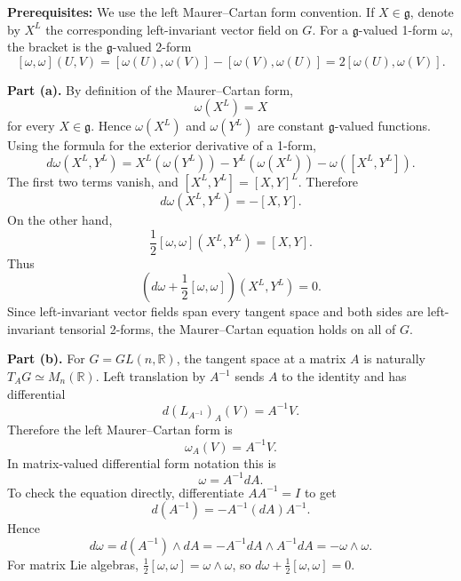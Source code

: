 \begin{solution}
\textbf{Prerequisites:}
We use the left Maurer--Cartan form convention. If $X\in\mathfrak{g}$, denote by
$X^L$ the corresponding left-invariant vector field on $G$. For a
$\mathfrak{g}$-valued 1-form $\omega$, the bracket is the
$\mathfrak{g}$-valued 2-form
\[
    [\omega,\omega](U,V)
    =
    [\omega(U),\omega(V)]-[\omega(V),\omega(U)]
    =
    2[\omega(U),\omega(V)].
\]

\textbf{Part (a).}
By definition of the Maurer--Cartan form,
\[
    \omega(X^L)=X
\]
for every $X\in\mathfrak{g}$. Hence $\omega(X^L)$ and $\omega(Y^L)$ are constant
$\mathfrak{g}$-valued functions. Using the formula for the exterior derivative of
a 1-form,
\[
    d\omega(X^L,Y^L)
    =
    X^L(\omega(Y^L))-Y^L(\omega(X^L))-\omega([X^L,Y^L]).
\]
The first two terms vanish, and $[X^L,Y^L]=[X,Y]^L$. Therefore
\[
    d\omega(X^L,Y^L)=-[X,Y].
\]
On the other hand,
\[
    \frac{1}{2}[\omega,\omega](X^L,Y^L)=[X,Y].
\]
Thus
\[
    \left(d\omega+\frac{1}{2}[\omega,\omega]\right)(X^L,Y^L)=0.
\]
Since left-invariant vector fields span every tangent space and both sides are
left-invariant tensorial 2-forms, the Maurer--Cartan equation holds on all of
$G$.

\textbf{Part (b).}
For $G=GL(n,\mathbb{R})$, the tangent space at a matrix $A$ is naturally
$T_A G\simeq M_n(\mathbb{R})$. Left translation by $A^{-1}$ sends $A$ to the
identity and has differential
\[
    d(L_{A^{-1}})_A(V)=A^{-1}V.
\]
Therefore the left Maurer--Cartan form is
\[
    \omega_A(V)=A^{-1}V.
\]
In matrix-valued differential form notation this is
\[
    \omega=A^{-1}dA.
\]
To check the equation directly, differentiate $AA^{-1}=I$ to get
\[
    d(A^{-1})=-A^{-1}(dA)A^{-1}.
\]
Hence
\[
    d\omega
    =
    d(A^{-1})\wedge dA
    =
    -A^{-1}dA\wedge A^{-1}dA
    =
    -\omega\wedge\omega.
\]
For matrix Lie algebras, $\frac12[\omega,\omega]=\omega\wedge\omega$, so
$d\omega+\frac12[\omega,\omega]=0$.


\end{solution}
